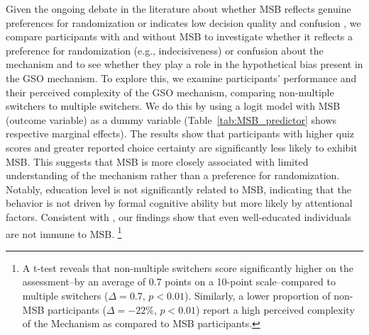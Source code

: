 \documentclass[12pt]{article}
\begin{document}
Given the ongoing debate in the literature about whether MSB reflects genuine preferences for randomization \citep{agranov2017stochastic} or indicates low decision quality and confusion \citep{charness2013experimental, yu2021multiple, filippin2016reconsideration}, we compare participants with and without MSB to investigate whether it reflects a preference for randomization (e.g., indecisiveness) or confusion about the mechanism and to see whether they play a role in the hypothetical bias present in the GSO mechanism. To explore this, we examine participants' performance and their perceived complexity of the GSO mechanism, comparing non-multiple switchers to multiple switchers. We do this by using a logit model with MSB (outcome variable) as a dummy variable (Table~\ref{tab:MSB_predictor} shows respective marginal effects). The results show that participants with higher quiz scores and greater reported choice certainty are significantly less likely to exhibit MSB. This suggests that MSB is more closely associated with limited understanding of the mechanism rather than  a preference for randomization. Notably, education level is not significantly related to MSB, indicating that the behavior is not driven by formal cognitive ability but more likely by attentional factors. Consistent with \citet{yu2021multiple}, our findings show that even well-educated individuals are not immune to MSB.
\footnote{A t-test reveals that non-multiple switchers score significantly higher on the assessment--by an average of 0.7 points on a 10-point scale--compared to multiple switchers (\(\Delta = 0.7\), \(p < 0.01\)). Similarly, a lower proportion of non-MSB participants (\(\Delta = -22\%\), \(p < 0.01\)) report a high perceived complexity of the Mechanism as compared to MSB participants.} 
\end{document}
